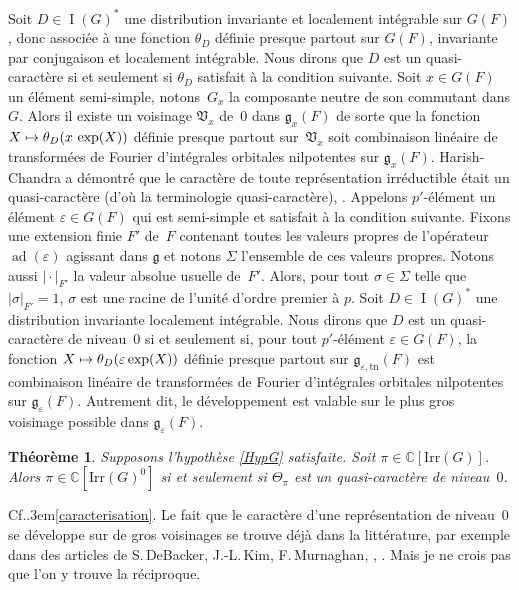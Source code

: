 \documentclass[JEP,XML,SOM,Unicode,francais]{cedram}
\let\epsilon\varepsilon
\newcommand\mto{\mathchoice{\longmapsto}{\mapsto}{\mapsto}{\mapsto}}
\newcommand\Cf{Cf.\kern.3em}
\newcommand{\frg}{\mathfrak{g}}
\newcommand{\frV}{\mathfrak{V}}
\newcommand{\Irr}{\mathrm{Irr}}
\newcommand{\tn}{\mathrm{tn}}
\DeclareMathOperator{\ad}{ad}
\DeclareMathOperator{\rI}{I}
\newcommand{\CC}{\mathbb{C}}
\theoremstyle{plain}
\newtheorem{thm}{Théorème}
\theoremstyle{definition}
\begin{document}
Soit $D\in \rI(G)^*$ une distribution invariante et localement intégrable sur
$G(F)$, donc associée à une fonction $\theta_{D}$ définie presque partout sur $G(F)$, invariante par conjugaison et localement intégrable. Nous dirons que $D$ est un quasi-caractère si et seulement si $\theta_{D}$ satisfait à la condition suivante. Soit $x\in G(F)$ un élément semi-simple, notons~$G_{x}$ la composante neutre de son commutant dans $G$. Alors il existe un voisinage $\frV_{x}$ de~$0$ dans $\frg_{x}(F)$ de sorte que la fonction $X\mto \theta_{D}(x\, \exp(X))$ définie presque partout sur~$\frV_{x}$ soit combinaison linéaire de transformées de Fourier d'intégrales orbitales nilpotentes sur $\frg_{x}(F)$. Harish-Chandra a démontré que le caractère de toute représentation irréductible était un quasi-caractère (d'où la terminologie \og quasi-caractère\fg), \cf \cite[Th.\,16.2]{HC}. Appelons $p'$-élément un élément $\epsilon\in G(F)$ qui est semi-simple et satisfait à la condition suivante. Fixons une extension finie $F'$ de~$F$ contenant toutes les valeurs propres de l'opérateur $\ad(\epsilon)$ agissant dans $\frg$ et notons $\Sigma$ l'ensemble de ces valeurs propres. Notons aussi $\vert {\cdot}\vert _{F'}$ la valeur absolue usuelle de~$F'$. Alors, pour tout $\sigma\in \Sigma$ telle que $\vert \sigma\vert _{F'}=1$, $\sigma$ est une racine de l'unité d'ordre premier à $p$. Soit $D\in \rI(G)^*$ une distribution invariante localement intégrable. Nous dirons que $D$ est un quasi-caractère de niveau~$0$ si et seulement si, pour tout $p'$-élément $\epsilon\in G(F)$, la fonction $X\mto \theta_{D}(\epsilon \exp(X))$ définie presque partout sur $\frg_{\epsilon,\tn}(F)$ est combinaison linéaire de transformées de Fourier d'intégrales orbitales nilpotentes sur $\frg_{\epsilon}(F)$. Autrement dit, le développement est valable sur le plus gros voisinage possible dans $\frg_{\epsilon}(F)$.\enlargethispage{\baselineskip}%

\begin{thm}\label{th:3}
Supposons l'hypothèse \ref{HypG} satisfaite. Soit \hbox{$\pi\!\in\!\CC[\Irr(G)]$}. Alors $\pi\in \CC[\Irr(G)^0]$ si et seulement si $\Theta_{\pi}$ est un quasi-caractère de niveau~$0$.
\end{thm}

\Cf \ref{caracterisation}. Le fait que le caractère d'une représentation de niveau~$0$ se développe sur de gros voisinages se trouve déjà dans la littérature, par exemple dans des articles de S.\,DeBacker, J.-L.\,Kim, F.\,Murnaghan, \cf \cite[Th.\,3.5.2]{D}, \cite[Th.\,5.3.1]{KM}. Mais je ne crois pas que l'on y trouve la réciproque.
\end{document}
